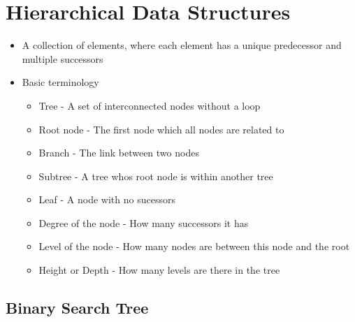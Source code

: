 
\section*{Hierarchical Data Structures}

\begin{itemize}
  \item A collection of elements, where each element has a unique predecessor and multiple successors
  \item Basic terminology
  \begin{itemize}
    \item Tree - A set of interconnected nodes without a loop
    \item Root node - The first node which all nodes are related to
    \item Branch - The link between two nodes
    \item Subtree - A tree whos root node is within another tree
    \item Leaf - A node with no sucessors
    \item Degree of the node - How many successors it has
    \item Level of the node - How many nodes are between this node and the root
    \item Height or Depth - How many levels are there in the tree
  \end{itemize}
\end{itemize}

\subsection*{Binary Search Tree}

